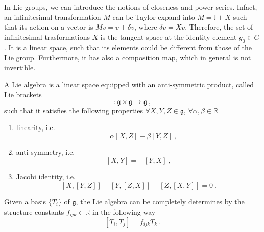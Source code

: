     In Lie groups, we can introduce the notions of closeness and power series. Infact, an infinitesimal transformation $M$ can be Taylor expand into $M = \mathbb I + X$ such that its action on a vector is $Mv = v + \delta v$, where $\delta v = X v$. Therefore, the set of infinitesimal trasformations $X$ is the tangent space at the identity element $g_0 \in G$. It is a linear space, such that its elements could be different from those of the Lie group. Furthermore, it has also a composition map, which in general is not invertible. 

    \begin{definition}
        A Lie algebra is a linear space equipped with an anti-symmetric product, called Lie brackets
        \begin{equation*}
            [~,~] \colon \mathfrak g \times \mathfrak g \rightarrow \mathfrak g ~,
        \end{equation*}
        such that it satisfies the following properties $\forall X, Y, Z \in \mathfrak g$, $\forall \alpha, \beta \in \mathbb R$
        \begin{enumerate}
            \item linearity, i.e.
            \begin{equation*}
                [\alpha X + \beta Y, Z] = \alpha [X, Z] + \beta [Y, Z] ~,
            \end{equation*}
            \item anti-symmetry, i.e.
            \begin{equation}\label{anti}
                [X, Y] = - [Y, X] ~,
            \end{equation}
            \item Jacobi identity, i.e.
            \begin{equation}\label{jacobi}
                [X, [Y, Z]] + [Y, [Z, X]] + [Z, [X, Y]] = 0 ~.
            \end{equation}
        \end{enumerate}
    \end{definition}

    \begin{definition}
        Given a basis $\{T_i\}$ of $\mathfrak g$, the Lie algebra can be completely determines by the structure constants $f_{ijk} \in \mathbb R$ in the following way
        \begin{equation}\label{stconsts}
            [T_i, T_j] = f_{ijk} T_k ~.
        \end{equation}
    \end{definition}

